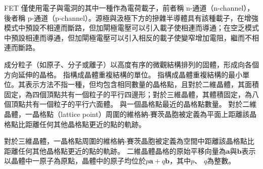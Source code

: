 \documentclass[a4paper,12pt]{report}
\begin{document}
FET 僅使用電子與電洞的其中一種作為電荷載子，前者稱 n-通道（n-channel），後者稱 p-通道（p-channel）。源極與汲極下方的摻雜半導體具有該種載子，在增強模式中預設不相連而斷路，但加閘極電壓可以引入載子使相連而導通；在空乏模式中預設相連而導通，但加閘極電壓可以引入相反的載子使變窄增加電阻，繼而不相連而斷路。



成分粒子（如原子、分子或離子）以高度有序的微觀結構排列的固體，形成向各個方向延伸的晶格。 
指構成晶體重複結構的單位。
指構成晶體重複結構的最小單位。其表示方法不指一種，但均包含相同數量的晶格點，且對於二維晶體，其面積固定，為四個頂點共有一個粒子的平行四邊形；對於三維晶體，其體積固定，為八個頂點共有一個粒子的平行六面體。
與一個晶格點最近的晶格點數量。
對於二維晶體，一晶格點（lattice point）周圍的維格納-賽茨晶胞被定義為平面上距離該晶格點比距離任何其他晶格點更近的點的軌跡。

對於三維晶體，一晶格點周圍的維格納-賽茨晶胞被定義為空間中距離該晶格點比距離任何其他晶格點更近的點的軌跡。
二維晶體晶格的原始平移向量為$\mathbf {a}$與$\mathbf{b}$表示以晶體中一原子為原點，晶體中的原子均位於$p\mathbf {a} +q\mathbf {b} $，其中$p$、 $q$為整數。
\end{document}
